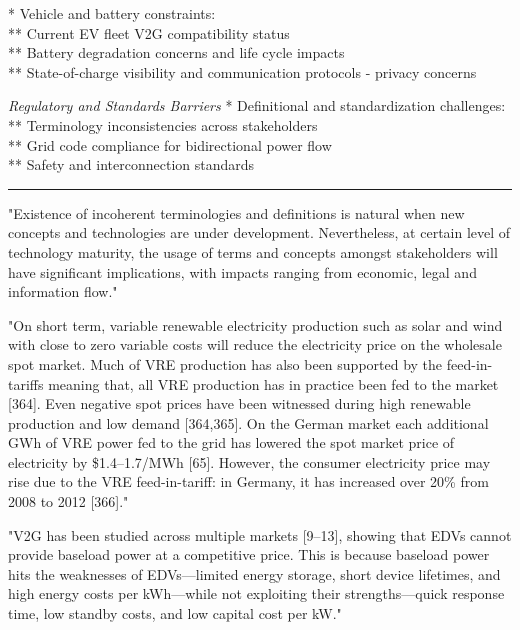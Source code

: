 * Vehicle and battery constraints: \\
** Current EV fleet V2G compatibility status \\
** Battery degradation concerns and life cycle impacts \\
** State-of-charge visibility and communication protocols - privacy concerns

\emph{Regulatory and Standards Barriers}
* Definitional and standardization challenges: \\
** Terminology inconsistencies across stakeholders \\
** Grid code compliance for bidirectional power flow \\
** Safety and interconnection standards


\hrule

"Existence of incoherent terminologies and definitions is natural when new concepts and technologies are under development. Nevertheless, at certain level of technology maturity, the usage of terms and concepts amongst stakeholders will have significant implications, with impacts ranging from economic, legal and information flow." \cite{degefa_comprehensive_2021}

"On short term, variable renewable electricity production such as solar and wind with close to zero variable costs will reduce the electricity price on the wholesale spot market. Much of VRE production has also been supported by the feed-in-tariffs meaning that, all VRE production has in practice been fed to the market [364]. Even negative spot prices have been witnessed during high renewable production and low demand [364,365]. On the German market each additional GWh of VRE power fed to the grid has lowered the spot market price of electricity by \$1.4–1.7/MWh [65]. However, the consumer electricity price may rise due to the VRE feed-in-tariff: in Germany, it has increased over 20\% from 2008 to 2012 [366]." \cite{lund_review_2015}

"V2G has been studied across multiple markets [9–13], showing that EDVs cannot provide baseload power at a competitive price. This is because baseload power hits the weaknesses of EDVs—limited energy storage, short device lifetimes, and high energy costs per kWh—while not exploiting their strengths—quick response time, low standby costs, and low capital cost per kW." \cite{kempton_vehicle--grid_2005}


